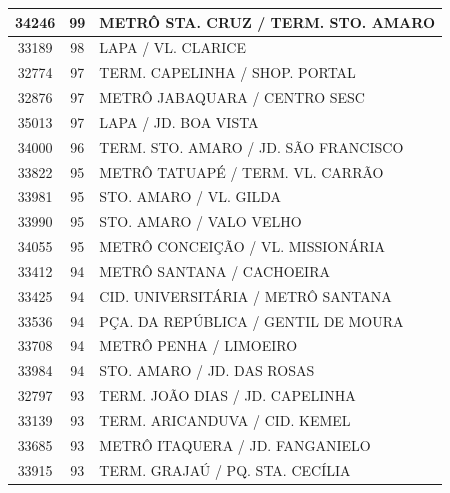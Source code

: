 \documentclass[
	12pt,				%
	oneside,			%
	a4paper,			%
	english,			%
	brazil				%
	]{abntex2ppgsi}
\begin{document}
{{\begin{apendicesenv}
\begin{longtable}{c|c|p{7cm}}
    34246 & 99    & METRÔ STA. CRUZ / TERM. STO. AMARO \\
\hline

    33189 & 98    & LAPA / VL. CLARICE \\
\hline

    32774 & 97    & TERM. CAPELINHA / SHOP. PORTAL \\
\hline

    32876 & 97    & METRÔ JABAQUARA / CENTRO SESC \\
\hline

    35013 & 97    & LAPA / JD. BOA VISTA \\
\hline

    34000 & 96    & TERM. STO. AMARO / JD. SÃO FRANCISCO \\
\hline

    33822 & 95    & METRÔ TATUAPÉ / TERM. VL. CARRÃO \\
\hline

    33981 & 95    & STO. AMARO / VL. GILDA \\
\hline

    33990 & 95    & STO. AMARO / VALO VELHO \\
\hline

    34055 & 95    & METRÔ CONCEIÇÃO / VL. MISSIONÁRIA \\
\hline

    33412 & 94    & METRÔ SANTANA / CACHOEIRA \\
\hline

    33425 & 94    & CID. UNIVERSITÁRIA / METRÔ SANTANA \\
\hline

    33536 & 94    & PÇA. DA REPÚBLICA / GENTIL DE MOURA \\
\hline

    33708 & 94    & METRÔ PENHA / LIMOEIRO \\
\hline

    33984 & 94    & STO. AMARO / JD. DAS ROSAS \\
\hline

    32797 & 93    & TERM. JOÃO DIAS / JD. CAPELINHA \\
\hline

    33139 & 93    & TERM. ARICANDUVA / CID. KEMEL \\
\hline

    33685 & 93    & METRÔ ITAQUERA / JD. FANGANIELO \\
\hline

    33915 & 93    & TERM. GRAJAÚ / PQ. STA. CECÍLIA \\
\hline


\end{longtable}
\end{apendicesenv}}}
\end{document}
